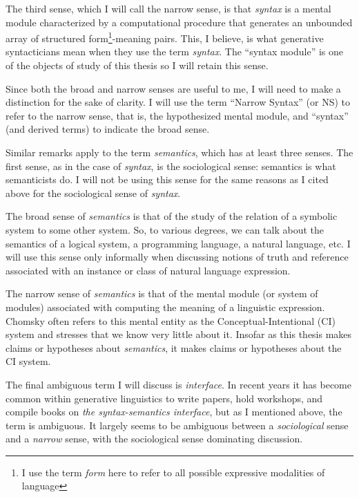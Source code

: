The third sense, which I will call the narrow sense, is that \textit{syntax} is a mental module characterized by a computational procedure that generates an unbounded array of structured form\footnote{I use the term \textit{form} here to refer to all possible expressive modalities of language}-meaning pairs.
This, I believe, is what generative syntacticians mean when they use the term \textit{syntax}.
The ``syntax module'' is one of the objects of study of this thesis so I will retain this sense.

Since both the broad and narrow senses are useful to me, I will need to make a distinction for the sake of clarity.
I will use the term ``Narrow Syntax'' (or NS) to refer to the narrow sense, that is, the hypothesized mental module, and ``syntax'' (and derived terms) to indicate the broad sense.

Similar remarks apply to the term \textit{semantics}, which has at least three senses.
The first sense, as in the case of \textit{syntax}, is the sociological sense: semantics is what semanticists do.
I will not be using this sense for the same reasons as I cited above for the sociological sense of \textit{syntax}.

The broad sense of \textit{semantics} is that of the study of the relation of a symbolic system to some other system.
So, to various degrees, we can talk about the semantics of a logical system, a programming language, a natural language, etc.
I will use this sense only informally when discussing notions of truth and reference associated with an instance or class of natural language expression.

The narrow sense of \textit{semantics} is that of the mental module (or system of modules) associated with computing the meaning of a linguistic expression.
Chomsky often refers to this mental entity as the Conceptual-Intentional (CI) system and stresses that we know very little about it.
Insofar as this thesis makes claims or hypotheses about \textit{semantics}, it makes claims or hypotheses about the CI system.

The final ambiguous term I will discuss is \textit{interface}.
In recent years it has become common within generative linguistics to write papers, hold workshops, and compile books on \textit{the syntax-semantics interface}, but as I mentioned above, the term is ambiguous.
It largely seems to be ambiguous between a \textit{sociological} sense and a \textit{narrow} sense, with the sociological sense dominating discussion.

